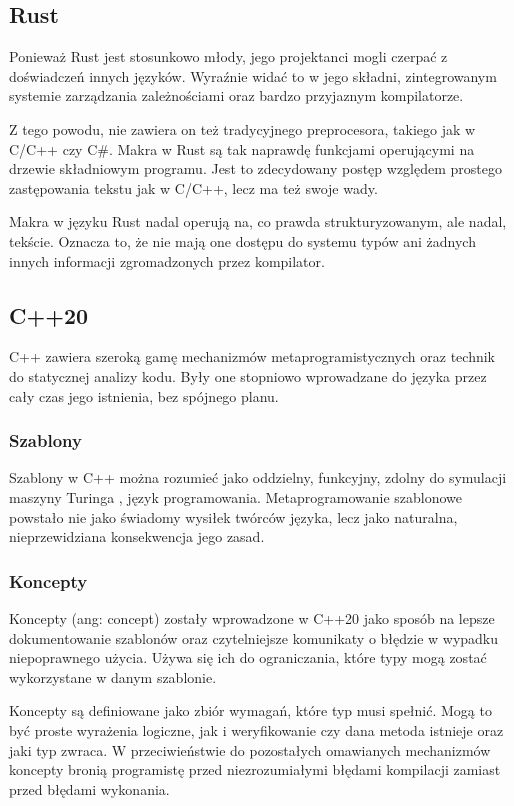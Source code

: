 \subsection {Rust}
Ponieważ Rust \cite{rust} jest stosunkowo młody, jego projektanci mogli czerpać z doświadczeń innych języków. Wyraźnie widać to w jego składni, zintegrowanym systemie zarządzania zależnościami oraz bardzo przyjaznym kompilatorze.\par
Z tego powodu, nie zawiera on też tradycyjnego preprocesora, takiego jak w C/C++ czy C\#. Makra w Rust są tak naprawdę funkcjami operującymi na drzewie składniowym programu. Jest to zdecydowany postęp względem prostego zastępowania tekstu jak w C/C++, lecz ma też swoje wady.\par
Makra w języku Rust nadal operują na, co prawda strukturyzowanym, ale nadal, tekście. Oznacza to, że nie mają one dostępu do systemu typów ani żadnych innych informacji zgromadzonych przez kompilator.\par
\subsection{C++20}
C++ \cite{ISO:cpp20} zawiera szeroką gamę mechanizmów metaprogramistycznych oraz technik do statycznej analizy kodu. Były one stopniowo wprowadzane do języka przez cały czas jego istnienia, bez spójnego planu.\par
\subsubsection{Szablony}
Szablony w C++ można rozumieć jako oddzielny, funkcyjny, zdolny do symulacji maszyny Turinga \cite{template_turing_complete}, język programowania.
Metaprogramowanie szablonowe powstało nie jako świadomy wysiłek twórców języka, lecz jako naturalna, nieprzewidziana konsekwencja jego zasad.

\subsubsection{Koncepty}
Koncepty (ang: concept) zostały wprowadzone w C++20 \cite{ISO:cpp20} jako sposób na lepsze dokumentowanie szablonów oraz czytelniejsze komunikaty o błędzie w wypadku niepoprawnego użycia.
Używa się ich do ograniczania, które typy mogą zostać wykorzystane w danym szablonie.

Koncepty są definiowane jako zbiór wymagań, które typ musi spełnić.
Mogą to być proste wyrażenia logiczne, jak i weryfikowanie czy dana metoda istnieje oraz jaki typ zwraca.
W przeciwieństwie do pozostałych omawianych mechanizmów koncepty bronią programistę przed niezrozumiałymi błędami kompilacji zamiast przed błędami wykonania.

